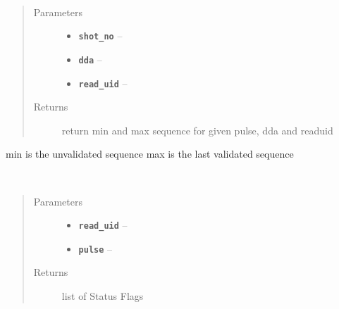 \documentclass[letterpaper,10pt,english]{sphinxmanual}
\begin{document}

\begin{fulllineitems}
\label{library:library.get_min_max_seq}~\begin{quote}\begin{description}
\item[{Parameters}] \leavevmode\begin{itemize}
\item {} 
\textbf{\texttt{shot\_no}} -- 

\item {} 
\textbf{\texttt{dda}} -- 

\item {} 
\textbf{\texttt{read\_uid}} -- 

\end{itemize}

\item[{Returns}] \leavevmode
return min and max sequence for given pulse, dda and readuid

\end{description}\end{quote}

min is the unvalidated sequence
max is the last validated sequence

\end{fulllineitems}


\begin{fulllineitems}
\label{library:library.check_SF}~\begin{quote}\begin{description}
\item[{Parameters}] \leavevmode\begin{itemize}
\item {} 
\textbf{\texttt{read\_uid}} -- 

\item {} 
\textbf{\texttt{pulse}} -- 

\end{itemize}

\item[{Returns}] \leavevmode
list of Status Flags

\end{description}\end{quote}

\end{fulllineitems}
\end{document}
